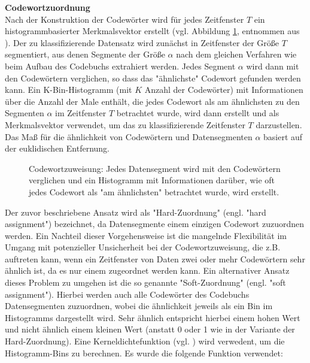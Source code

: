 \textbf{Codewortzuordnung \\}
Nach der Konstruktion der Codew{\"o}rter wird f{\"u}r jedes Zeitfenster $T$ ein histogrammbasierter Merkmalsvektor erstellt (vgl. Abbildung \ref{fig:ca_assignment}, entnommen aus \cite{kimiaki_codebook_approach_2016}). 
Der zu klassifizierende Datensatz wird zun{\"a}chst in Zeitfenster der Gr{\"o}{\ss}e $T$ segmentiert, aus denen Segmente der Gr{\"o}{\ss}e $\alpha$ nach dem gleichen Verfahren wie beim Aufbau des Codebuchs extrahiert werden. 
Jedes Segment $\alpha$ wird dann mit den Codew{\"o}rtern verglichen, so dass das "{\"a}hnlichste" Codewort gefunden werden kann. 
Ein K-Bin-Histogramm (mit $K$ Anzahl der Codew{\"o}rter) mit Informationen {\"u}ber die Anzahl der Male enth{\"a}lt, die jedes Codewort als am {\"a}hnlichsten zu den Segmenten $\alpha$ im Zeitfenster $T$ betrachtet wurde, wird dann erstellt und als Merkmalsvektor verwendet, um das zu klassifizierende Zeitfenster $T$ darzustellen. 
Das Ma{\ss} f{\"u}r die {\"a}hnlichkeit von Codew{\"o}rtern und Datensegmenten $\alpha$ basiert auf der euklidischen Entfernung. \\


\begin{figure}[h]
\caption[Codewortzuweisung]{Codewortzuweisung: Jedes Datensegment wird mit den Codew{\"o}rtern verglichen und ein Histogramm mit Informationen dar{\"u}ber, wie oft jedes Codewort als "am {\"a}hnlichsten" betrachtet wurde, wird erstellt. }
\label{fig:ca_assignment} \end{figure} \vspace{0.5cm}


Der zuvor beschriebene Ansatz wird als "Hard-Zuordnung" (engl. "hard assignment") bezeichnet, da Datensegmente einem einzigen Codewort zuzuordnen werden.
Ein Nachteil dieser Vorgehensweise ist die mangelnde Flexibilit{\"a}t im Umgang mit potenzieller Unsicherheit bei der Codewortzuweisung, die z.B. auftreten kann, wenn ein Zeitfenster von Daten zwei oder mehr Codew{\"o}rtern sehr {\"a}hnlich ist, da es nur einem zugeordnet werden kann. 
Ein alternativer Ansatz dieses Problem zu umgehen ist die so genannte "Soft-Zuordnung" (engl. "soft assignment"). Hierbei werden auch alle Codew{\"o}rter des Codebuchs Datensegmenten zuzuordnen, wobei die {\"a}hnlichkeit jeweils als ein Bin im Histogramms dargestellt wird. Sehr {\"a}hnlich entspricht hierbei einem hohen Wert und nicht {\"a}hnlich einem kleinen Wert (anstatt 0 oder 1 wie in der Variante der Hard-Zuordnung). 
Eine Kerneldichtefunktion (vgl. \cite{gemert_ieee_2009}) wird verwedent, um die Histogramm-Bins zu berechnen. Es wurde die folgende Funktion verwendet:


